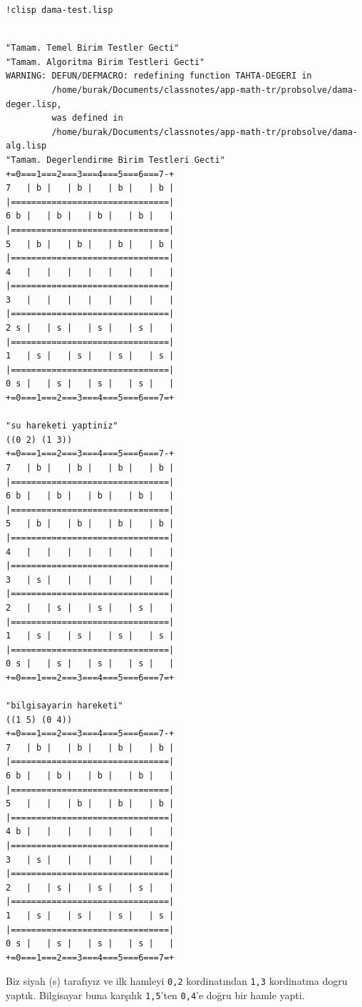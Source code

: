 \documentclass[12pt,fleqn]{article}\usepackage{../../common}
\begin{document}
\begin{verbatim}
!clisp dama-test.lisp
\end{verbatim}

\begin{verbatim}

"Tamam. Temel Birim Testler Gecti" 
"Tamam. Algoritma Birim Testleri Gecti" 
WARNING: DEFUN/DEFMACRO: redefining function TAHTA-DEGERI in
         /home/burak/Documents/classnotes/app-math-tr/probsolve/dama-deger.lisp,
         was defined in
         /home/burak/Documents/classnotes/app-math-tr/probsolve/dama-alg.lisp
"Tamam. Degerlendirme Birim Testleri Gecti" 
+=0===1===2===3===4===5===6===7-+
7   | b |   | b |   | b |   | b |
|===============================|
6 b |   | b |   | b |   | b |   |
|===============================|
5   | b |   | b |   | b |   | b |
|===============================|
4   |   |   |   |   |   |   |   |
|===============================|
3   |   |   |   |   |   |   |   |
|===============================|
2 s |   | s |   | s |   | s |   |
|===============================|
1   | s |   | s |   | s |   | s |
|===============================|
0 s |   | s |   | s |   | s |   |
+=0===1===2===3===4===5===6===7=+

"su hareketi yaptiniz" 
((0 2) (1 3)) 
+=0===1===2===3===4===5===6===7-+
7   | b |   | b |   | b |   | b |
|===============================|
6 b |   | b |   | b |   | b |   |
|===============================|
5   | b |   | b |   | b |   | b |
|===============================|
4   |   |   |   |   |   |   |   |
|===============================|
3   | s |   |   |   |   |   |   |
|===============================|
2   |   | s |   | s |   | s |   |
|===============================|
1   | s |   | s |   | s |   | s |
|===============================|
0 s |   | s |   | s |   | s |   |
+=0===1===2===3===4===5===6===7=+

"bilgisayarin hareketi" 
((1 5) (0 4)) 
+=0===1===2===3===4===5===6===7-+
7   | b |   | b |   | b |   | b |
|===============================|
6 b |   | b |   | b |   | b |   |
|===============================|
5   |   |   | b |   | b |   | b |
|===============================|
4 b |   |   |   |   |   |   |   |
|===============================|
3   | s |   |   |   |   |   |   |
|===============================|
2   |   | s |   | s |   | s |   |
|===============================|
1   | s |   | s |   | s |   | s |
|===============================|
0 s |   | s |   | s |   | s |   |
+=0===1===2===3===4===5===6===7=+
\end{verbatim}

Biz siyah (s) tarafıyız ve ilk hamleyi \verb!0,2! kordinatından \verb!1,3!
kordinatına dogru yaptık. Bilgisayar buna karşılık \verb!1,5!'ten
\verb!0,4!'e doğru bir hamle yapti. %
\end{document}
